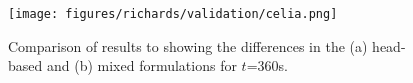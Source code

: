 \begin{figure}[ht]
\begin{center}
\texttt{[image: figures/richards/validation/celia.png]}
\end{center}
\caption{
    Comparison of results to \cite{Celia1990} showing the differences in the
    (a) head-based and (b) mixed formulations for $t$=360s.
}
\label{fig:richards-celia}
\end{figure}
